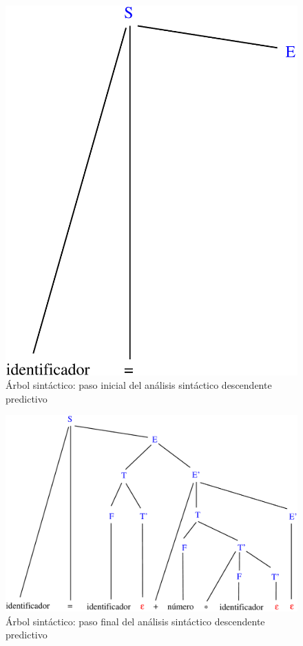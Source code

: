 \begin{figure}[!t]
    \centering
        \includegraphics[scale=0.40]{figuras/Cap3/Paso-2-arbol-derivacion-descendente.pdf}
    \caption{Árbol sintáctico: paso inicial del análisis sintáctico descendente predictivo}\label{fig:pasos-2-analisis-descendente-predictivo}
\end{figure}


\begin{figure}[!t]
    \centering
        \includegraphics[scale=0.40]{figuras/Cap3/Paso-13-arbol-derivacion-descendente.pdf}
    \caption{Árbol sintáctico: paso final del análisis sintáctico descendente predictivo}\label{fig:pasos-final-analisis-descendente-predictivo}
\end{figure}

